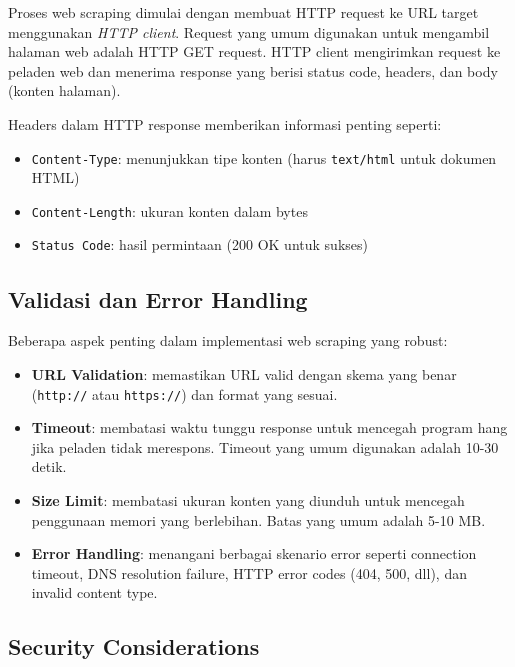 Proses web scraping dimulai dengan membuat HTTP request ke URL target menggunakan
\textit{HTTP client}. Request yang umum digunakan untuk mengambil halaman web adalah
HTTP GET request. HTTP client mengirimkan request ke peladen web dan menerima
response yang berisi status code, headers, dan body (konten halaman).

Headers dalam HTTP response memberikan informasi penting seperti:
\begin{itemize}
    \item \texttt{Content-Type}: menunjukkan tipe konten (harus \texttt{text/html}
    untuk dokumen HTML)
    \item \texttt{Content-Length}: ukuran konten dalam bytes
    \item \texttt{Status Code}: hasil permintaan (200 OK untuk sukses)
\end{itemize}

\subsection{Validasi dan Error Handling}

Beberapa aspek penting dalam implementasi web scraping yang robust:

\begin{itemize}
    \item \textbf{URL Validation}: memastikan URL valid dengan skema yang benar
    (\texttt{http://} atau \texttt{https://}) dan format yang sesuai.
    
    \item \textbf{Timeout}: membatasi waktu tunggu response untuk mencegah program
    hang jika peladen tidak merespons. Timeout yang umum digunakan adalah 10-30
detik.
    
    \item \textbf{Size Limit}: membatasi ukuran konten yang diunduh untuk mencegah
    penggunaan memori yang berlebihan. Batas yang umum adalah 5-10 MB.
    
    \item \textbf{Error Handling}: menangani berbagai skenario error seperti
    connection timeout, DNS resolution failure, HTTP error codes (404, 500, dll),
    dan invalid content type.
\end{itemize}

\subsection{Security Considerations}

